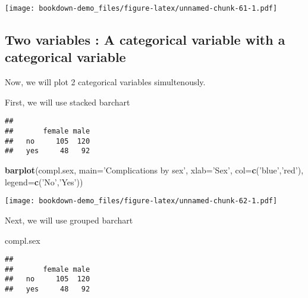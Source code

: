 \documentclass[]{book}
\newenvironment{Shaded}{\begin{snugshade}}{\end{snugshade}}
\newcommand{\KeywordTok}[1]{\textcolor[rgb]{0.13,0.29,0.53}{\textbf{#1}}}
\newcommand{\DataTypeTok}[1]{\textcolor[rgb]{0.13,0.29,0.53}{#1}}
\newcommand{\StringTok}[1]{\textcolor[rgb]{0.31,0.60,0.02}{#1}}
\newcommand{\OperatorTok}[1]{\textcolor[rgb]{0.81,0.36,0.00}{\textbf{#1}}}
\newcommand{\NormalTok}[1]{#1}
\theoremstyle{definition}
\theoremstyle{definition}
\theoremstyle{remark}
\begin{document}
\texttt{[image: bookdown-demo\_files/figure-latex/unnamed-chunk-61-1.pdf]}

\subsection{Two variables : A categorical variable with a categorical
variable}\label{two-variables-a-categorical-variable-with-a-categorical-variable}

Now, we will plot 2 categorical variables simultenously.

First, we will use stacked barchart

\begin{Shaded}
\end{Shaded}

\begin{verbatim}
##      
##       female male
##   no     105  120
##   yes     48   92
\end{verbatim}

\begin{Shaded}
\begin{Highlighting}[]
\KeywordTok{barplot}\NormalTok{(compl.sex,}
        \DataTypeTok{main=}\StringTok{'Complications by sex'}\NormalTok{,}
        \DataTypeTok{xlab=}\StringTok{'Sex'}\NormalTok{,}
        \DataTypeTok{col=}\KeywordTok{c}\NormalTok{(}\StringTok{'blue'}\NormalTok{,}\StringTok{'red'}\NormalTok{),}
        \DataTypeTok{legend=}\KeywordTok{c}\NormalTok{(}\StringTok{'No'}\NormalTok{,}\StringTok{'Yes'}\NormalTok{))}
\end{Highlighting}
\end{Shaded}

\texttt{[image: bookdown-demo\_files/figure-latex/unnamed-chunk-62-1.pdf]}

Next, we will use grouped barchart

\begin{Shaded}
\begin{Highlighting}[]
\NormalTok{compl.sex}
\end{Highlighting}
\end{Shaded}

\begin{verbatim}
##      
##       female male
##   no     105  120
##   yes     48   92
\end{verbatim}
\end{document}
